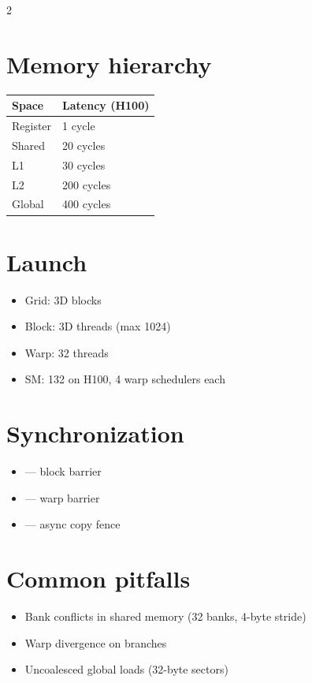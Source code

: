 \documentclass{cheatsheet}
\begin{document}
\maketitle
\begin{multicols}{2}

	\section{Memory hierarchy}
	\begin{tabular}{ll}
		\toprule
		\textbf{Space} & \textbf{Latency (H100)} \\
		\midrule
		Register       & 1 cycle                 \\
		Shared         & 20 cycles               \\
		L1             & 30 cycles               \\
		L2             & 200 cycles              \\
		Global         & 400 cycles              \\
		\bottomrule
	\end{tabular}

	\section{Launch}
	\begin{itemize}
		\item Grid: 3D blocks
		\item Block: 3D threads (max 1024)
		\item Warp: 32 threads
		\item SM: 132 on H100, 4 warp schedulers each
	\end{itemize}

	\section{Synchronization}
	\begin{itemize}
		\item {} — block barrier
		\item {} — warp barrier
		\item {} — async copy fence
	\end{itemize}

	\section{Common pitfalls}
	\begin{itemize}
		\item Bank conflicts in shared memory (32 banks, 4-byte stride)
		\item Warp divergence on  branches
		\item Uncoalesced global loads (32-byte sectors)
	\end{itemize}

\end{multicols}
\end{document}
